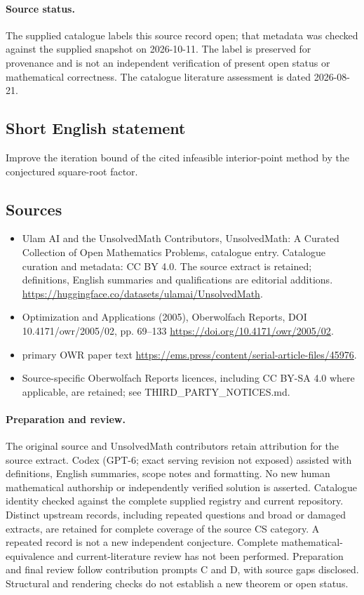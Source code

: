 \documentclass[11pt]{article}
\begin{document}
\paragraph{Source status.}
The supplied catalogue labels this source record open; that metadata was checked against the supplied snapshot on 2026-10-11. The label is preserved for provenance and is not an independent verification of present open status or mathematical correctness. The catalogue literature assessment is dated 2026-08-21.
\subsection{Short English statement}
Improve the iteration bound of the cited infeasible interior-point method by the conjectured square-root factor.
\subsection{Sources}
\begin{itemize}
\item[S1] Ulam AI and the UnsolvedMath Contributors, UnsolvedMath: A Curated Collection of Open Mathematics Problems, catalogue entry. Catalogue curation and metadata: CC BY 4.0. The source extract is retained; definitions, English summaries and qualifications are editorial additions.
\url{https://huggingface.co/datasets/ulamai/UnsolvedMath}.
\item[S2] Optimization and Applications (2005), Oberwolfach Reports, DOI 10.4171/owr/2005/02, pp. 69--133
\url{https://doi.org/10.4171/owr/2005/02}.
\item[S3] primary OWR paper text
\url{https://ems.press/content/serial-article-files/45976}.
\item Source-specific Oberwolfach Reports licences, including CC BY-SA 4.0 where applicable, are retained; see THIRD\_PARTY\_NOTICES.md.
\end{itemize}
\paragraph{Preparation and review.}
The original source and UnsolvedMath contributors retain attribution for the source extract. Codex (GPT-6; exact serving revision not exposed) assisted with definitions, English summaries, scope notes and formatting. No new human mathematical authorship or independently verified solution is asserted. Catalogue identity checked against the complete supplied registry and current repository. Distinct upstream records, including repeated questions and broad or damaged extracts, are retained for complete coverage of the source CS category. A repeated record is not a new independent conjecture. Complete mathematical-equivalence and current-literature review has not been performed. Preparation and final review follow contribution prompts C and D, with source gaps disclosed. Structural and rendering checks do not establish a new theorem or open status.
\label{end:statement}
\end{document}
